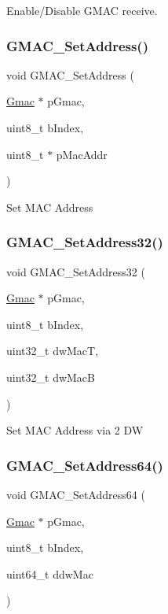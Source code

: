 Enable/\+Disable G\+M\+AC receive. \mbox{\label{group__gmac__defines_ga52528649e180e7e7ed1b9533ec6337fd}} 
\subsubsection{\texorpdfstring{GMAC\_SetAddress()}{GMAC\_SetAddress()}}
{\footnotesize\ttfamily void G\+M\+A\+C\+\_\+\+Set\+Address (\begin{DoxyParamCaption}\item[{\mbox{\hyperlink{structGmac}{Gmac}} $\ast$}]{p\+Gmac,  }\item[{uint8\+\_\+t}]{b\+Index,  }\item[{uint8\+\_\+t $\ast$}]{p\+Mac\+Addr }\end{DoxyParamCaption})}

Set M\+AC Address \mbox{\label{group__gmac__defines_ga12cb5d7dcc37d8fd85ca6edd679ace73}} 
\subsubsection{\texorpdfstring{GMAC\_SetAddress32()}{GMAC\_SetAddress32()}}
{\footnotesize\ttfamily void G\+M\+A\+C\+\_\+\+Set\+Address32 (\begin{DoxyParamCaption}\item[{\mbox{\hyperlink{structGmac}{Gmac}} $\ast$}]{p\+Gmac,  }\item[{uint8\+\_\+t}]{b\+Index,  }\item[{uint32\+\_\+t}]{dw\+MacT,  }\item[{uint32\+\_\+t}]{dw\+MacB }\end{DoxyParamCaption})}

Set M\+AC Address via 2 DW \mbox{\label{group__gmac__defines_ga50bcf8daa0c205fc18df7c1bf835cb01}} 
\subsubsection{\texorpdfstring{GMAC\_SetAddress64()}{GMAC\_SetAddress64()}}
{\footnotesize\ttfamily void G\+M\+A\+C\+\_\+\+Set\+Address64 (\begin{DoxyParamCaption}\item[{\mbox{\hyperlink{structGmac}{Gmac}} $\ast$}]{p\+Gmac,  }\item[{uint8\+\_\+t}]{b\+Index,  }\item[{uint64\+\_\+t}]{ddw\+Mac }\end{DoxyParamCaption})}

